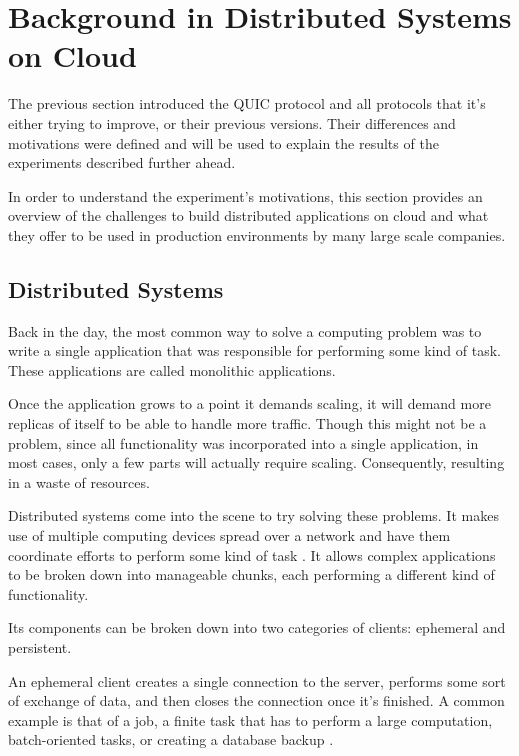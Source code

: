\section{Background in Distributed Systems on Cloud}

The previous section introduced the QUIC protocol and all protocols that it’s either trying to improve, or their previous versions. Their differences and motivations were defined and will be used to explain the results of the experiments described further ahead.

In order to understand the experiment's motivations, this section provides an overview of the challenges to build distributed applications on cloud and what they offer to be used in production environments by many large scale companies.

\subsection{Distributed Systems}

Back in the day, the most common way to solve a computing problem was to write a single application that was responsible for performing some kind of task. These applications are called monolithic applications.

Once the application grows to a point it demands scaling, it will demand more replicas of itself to be able to handle more traffic. Though this might not be a problem, since all functionality was incorporated into a single application, in most cases, only a few parts will actually require scaling. Consequently, resulting in a waste of resources.

Distributed systems come into the scene to try solving these problems. It makes use of multiple computing devices spread over a network and have them coordinate efforts to perform some kind of task \cite{distributed_systems_principles}. It allows complex applications to be broken down into manageable chunks, each performing a different kind of functionality.

Its components can be broken down into two categories of clients: ephemeral and persistent.

An ephemeral client creates a single connection to the server, performs some sort of exchange of data, and then closes the connection once it’s finished. A common example is that of a job, a finite task that has to perform a large computation, batch-oriented tasks, or creating a database backup \cite{os_distributed_systems}.

